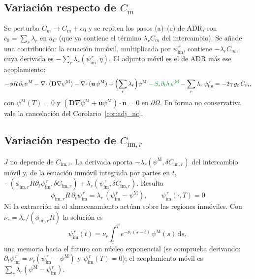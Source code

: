 \documentclass[11pt]{article}
\numberwithin{equation}{section}
\theoremstyle{plain}
\theoremstyle{definition}
\theoremstyle{remark}
\newcommand{\bu}{\mathbf{u}}
\newcommand{\bD}{\mathbf{D}}
\newcommand{\bn}{\mathbf{n}}
\newcommand{\Ceps}{g_\varepsilon}              %
\newcommand{\im}{\mathrm{im}}
\newcommand{\pM}{\psi^{\mathrm M}}          %
\newcommand{\pim}{\psi_{\im}}               %
\newcommand{\dd}{\,\mathrm d}
\newcommand{\alm}[1]{{\color{cAlm}#1}}
\begin{document}
\subsection{Variación respecto de $C_m$}
Se perturba $C_m\to C_m+\epsilon\eta$ y se repiten los pasos (a)--(c) de ADR, con $c_0=\sum_r\lambda_r$ en $a_C$ (que
ya contiene el término $\lambda_rC_m$ del intercambio). Se añade una contribución: la ecuación inmóvil, multiplicada
por $\pim^{\,r}$, contiene $-\lambda_rC_m$, cuya derivada es $-\sum_r\lambda_r(\pim^{\,r},\eta)$. El adjunto móvil es el de ADR más ese acoplamiento:
\begin{equation}
-\phi R\,\partial_t\pM-\nabla\!\cdot(\bD\nabla\pM)-\nabla\!\cdot(\bu\,\pM)
+\Bigl(\sum_r\lambda_r\Bigr)\pM\;\alm{-\,S_s\partial_th\,\pM}-\sum_r\lambda_r\,\pim^{\,r}=-2\gamma\,\Ceps\,C_m,
\label{eq:adj_movil}
\end{equation}
con $\pM(T)=0$ y $(\bD\nabla\pM+\bu\pM)\cdot\bn=0$ en $\partial\Omega$. En forma no conservativa vale la cancelación del
Corolario~\ref{cor:adj_nc}.

\subsection{Variación respecto de $C_{\im,r}$}
$J$ no depende de $C_{\im,r}$. La derivada aporta $-\lambda_r(\pM,\delta C_{\im,r})$ del intercambio móvil y, de
la ecuación inmóvil integrada por partes en $t$, $-(\phi_{\im,r}R\partial_t\pim^{\,r},\delta C_{\im,r})+\lambda_r(\pim^{\,r},\delta C_{\im,r})$. Resulta
\begin{equation}
\boxed{\ \phi_{\im,r}R\,\partial_t\pim^{\,r}=\lambda_r\,(\pim^{\,r}-\pM),
\qquad\pim^{\,r}(\cdot,T)=0\ }
\label{eq:adj_inmovil}
\end{equation}
Ni la extracción ni el almacenamiento actúan sobre las regiones inmóviles. Con $\nu_r=\lambda_r/(\phi_{\im,r}R)$ la solución es
\begin{equation}
\pim^{\,r}(t)=\nu_r\int_t^Te^{-\nu_r(s-t)}\,\pM(s)\dd s ,
\label{eq:psi_im_memoria}
\end{equation}
una memoria hacia el futuro con núcleo exponencial (se comprueba derivando: $\partial_t\pim^{\,r}=\nu_r(\pim^{\,r}-\pM)$ y $\pim^{\,r}(T)=0$); el acoplamiento móvil es $\sum_r\lambda_r(\pM-\pim^{\,r})$.
\end{document}
